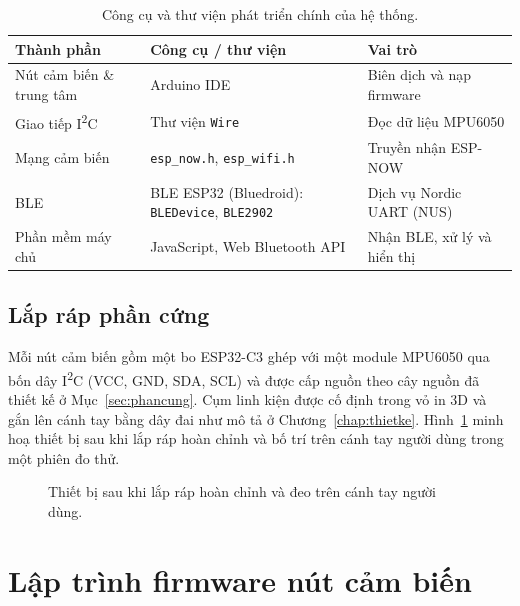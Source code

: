 \documentclass[../DoAn.tex]{subfiles}
\begin{document}
\begin{table}[H]
    \centering
    \caption{Công cụ và thư viện phát triển chính của hệ thống.}
    \label{tab:toolchain}
    \begin{tabular}{p{3.6cm} p{4.8cm} p{4.8cm}}
        \toprule
        \textbf{Thành phần}             & \textbf{Công cụ / thư viện}               & \textbf{Vai trò}            \\
        \midrule
        Nút cảm biến \& trung tâm       & Arduino IDE                               & Biên dịch và nạp firmware   \\
        Giao tiếp I\textsuperscript{2}C & Thư viện \texttt{Wire}                    & Đọc dữ liệu MPU6050         \\
        Mạng cảm biến                   & \texttt{esp\_now.h}, \texttt{esp\_wifi.h} & Truyền nhận ESP-NOW         \\
        BLE                             & BLE ESP32 (Bluedroid): \texttt{BLEDevice}, \texttt{BLE2902} & Dịch vụ Nordic UART (NUS)   \\
        Phần mềm máy chủ                & JavaScript, Web Bluetooth API             & Nhận BLE, xử lý và hiển thị \\
        \bottomrule
    \end{tabular}
\end{table}

\subsection{Lắp ráp phần cứng}
Mỗi nút cảm biến gồm một bo ESP32-C3 ghép với một module MPU6050 qua bốn dây I\textsuperscript{2}C (VCC, GND, SDA, SCL) và được cấp nguồn theo cây nguồn đã thiết kế ở Mục~\ref{sec:phancung}. Cụm linh kiện được cố định trong vỏ in 3D và gắn lên cánh tay bằng dây đai như mô tả ở Chương~\ref{chap:thietke}. Hình~\ref{fig:assembly} minh hoạ thiết bị sau khi lắp ráp hoàn chỉnh và bố trí trên cánh tay người dùng trong một phiên đo thử.

\begin{figure}[H]
    \centering
    \caption{Thiết bị sau khi lắp ráp hoàn chỉnh và đeo trên cánh tay người dùng.}
    \label{fig:assembly}
\end{figure}




\section{Lập trình firmware nút cảm biến}
\label{sec:fw_node}
\end{document}
